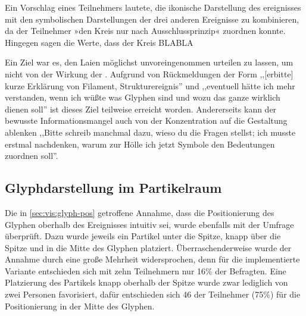 


Ein Vorschlag eines Teilnehmers lautete, die ikonische Darstellung des ereignisses mit den symbolischen Darstellungen der drei anderen Ereignisse zu kombinieren, da der Teilnehmer »den Kreis nur nach Ausschlussprinzip« zuordnen konnte. Hingegen sagen die Werte, dass der Kreis BLABLA

Ein Ziel war es, den Laien möglichst unvoreingenommen urteilen zu lassen, um nicht von der Wirkung der . Aufgrund von Rückmeldungen der Form ,,[erbitte] kurze Erklärung von Filament, Strukturereignis'' und ,,eventuell hätte ich mehr verstanden, wenn ich wüßte was Glyphen sind und wozu das ganze wirklich dienen soll'' ist dieses Ziel teilweise erreicht worden. Andererseits kann der bewusste Informationsmangel auch von der Konzentration auf die Gestaltung ablenken ,,Bitte schreib manchmal dazu, wieso du die Fragen stellst; ich musste erstmal nachdenken, warum zur Hölle ich jetzt Symbole den Bedeutungen zuordnen soll''.


\subsection*{Glyphdarstellung im Partikelraum}\label{sec:eva:glyphdarstellung}

Die in \autoref{sec:vis:glyph-pos} getroffene Annahme, dass die Positionierung des Glyphen oberhalb des Ereignisses intuitiv sei, wurde ebenfalls mit der Umfrage überprüft. Dazu wurde jeweils ein Partikel unter die Spitze, knapp über die Spitze und in die Mitte des Glyphen platziert. Überraschenderweise wurde der Annahme durch eine große Mehrheit widersprochen, denn für die implementierte Variante entschieden sich mit zehn Teilnehmern nur 16\% der Befragten. Eine Platzierung des Partikels knapp oberhalb der Spitze wurde zwar lediglich von zwei Personen favorisiert, dafür entschieden sich 46 der Teilnehmer (75\%) für die Positionierung in der Mitte des Glyphen.

